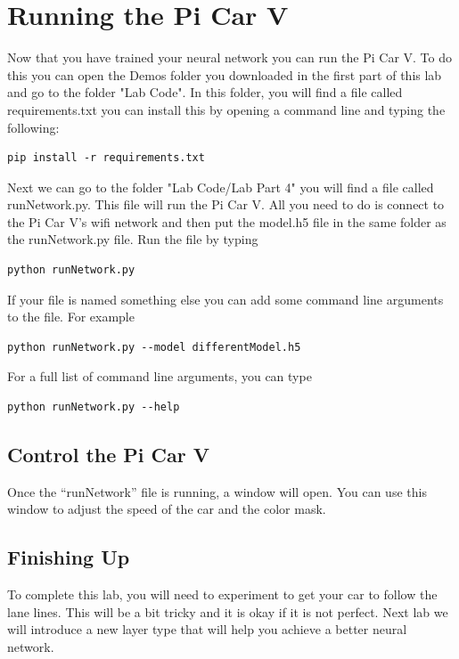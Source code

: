 \documentclass[11pt]{report}
\begin{document}
\chapter{Running the Pi Car V}
Now that you have trained your neural network you can run the Pi Car V. To do this you can open the Demos folder you downloaded in the first part of this lab and go to the folder "Lab Code". In this folder, you will find a file called requirements.txt you can install this by opening a command line and typing the following:
\begin{verbatim}
pip install -r requirements.txt
\end{verbatim}
Next we can go to the folder "Lab Code/Lab Part 4" you will find a file called runNetwork.py. This file will run the Pi Car V. All you need to do is connect to the Pi Car V's wifi network and then put the model.h5 file in the same folder as the runNetwork.py file. Run the file by typing 
\begin{verbatim}
python runNetwork.py
\end{verbatim}
If your file is named something else you can add some command line arguments to the file. For example
\begin{verbatim}
python runNetwork.py --model differentModel.h5    
\end{verbatim}
For a full list of command line arguments, you can type 
\begin{verbatim}
python runNetwork.py --help
\end{verbatim}
\section{Control the Pi Car V}
Once the “runNetwork” file is running, a window will open. You can use this window to adjust the speed of the car and the color mask.

\section{Finishing Up}
To complete this lab, you will need to experiment to get your car to follow the lane lines. This will be a bit tricky and it is okay if it is not perfect. Next lab we will introduce a new layer type that will help you achieve a better neural network.
\end{document}
